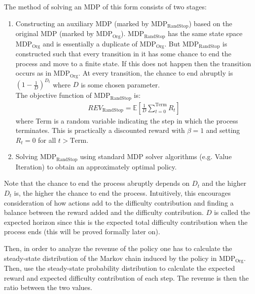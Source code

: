 \documentclass{article}
\newcommand{\E}[1]{\mathbb{E} \left[ #1 \right]}
\newcommand{\orgmdp}{\text{MDP}_\text{Org}}
\newcommand{\auxmdp}{\text{MDP}_\text{RandStop}}
\newcommand{\revaux}{\textit{REV}_\text{RandStop}}
\begin{document}
The method of solving an MDP of this form consists of two stages:
\begin{enumerate}
    \item Constructing an auxiliary MDP (marked by $\auxmdp$) based on the original MDP (marked by $\orgmdp$). $\auxmdp$ has the same state space $\orgmdp$ and is essentially a duplicate of $\orgmdp$. But $\auxmdp$ is constructed such that every transition in it has some chance to end the process and move to a finite state. If this does not happen then the transition occurs as in $\orgmdp$.
    At every transition, the chance to end abruptly is $(1 - \frac{1}{D})^{D_t}$ where $D$ is some chosen parameter.\\
    The objective function of $\auxmdp$ is:
    \begin{gather*}
        \revaux = \E{\frac{1}{D} \sum\limits_{t=0}^\text{Term} R_t}
    \end{gather*}
    where Term is a random variable indicating the step in which the process terminates. This is practically a discounted reward with $\beta = 1$ and setting $R_t = 0$ for all $t > \text{Term}$.
    \item Solving $\auxmdp$ using standard MDP solver algorithms (e.g. Value Iteration) to obtain an approximately optimal policy.
\end{enumerate}

Note that the chance to end the process abruptly depends on $D_t$ and the higher $D_t$ is, the higher the chance to end the process. Intuitively, this encourages consideration of how actions add to the difficulty contribution and finding a balance between the reward added and the difficulty contribution. $D$ is called the expected horizon since this is the expected total difficulty contribution when the process ends (this will be proved formally later on).

Then, in order to analyze the revenue of the policy one has to calculate the steady-state  distribution of the Markov chain induced by the policy in $\orgmdp$. Then, use the steady-state probability distribution to calculate the expected reward and expected difficulty contribution of each step. The revenue is then the ratio between the two values.
\end{document}
